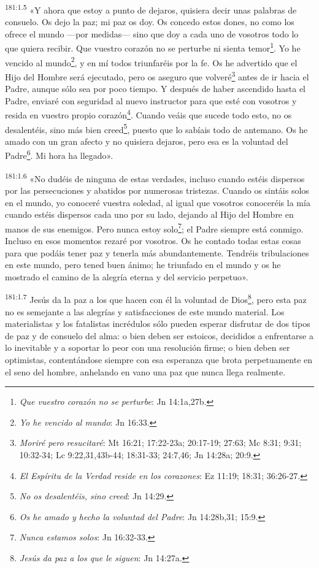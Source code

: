 \par
\textsuperscript{181:1.5} «Y ahora que estoy a punto de dejaros, quisiera decir unas palabras de consuelo. Os dejo la paz; mi paz os doy. Os concedo estos dones, no como los ofrece el mundo ---por medidas--- sino que doy a cada uno de vosotros todo lo que quiera recibir. Que vuestro corazón no se perturbe ni sienta temor\footnote{\textit{Que vuestro corazón no se perturbe}: Jn 14:1a,27b.}. Yo he vencido al mundo\footnote{\textit{Yo he vencido al mundo}: Jn 16:33.}, y en mí todos triunfaréis por la fe. Os he advertido que el Hijo del Hombre será ejecutado, pero os aseguro que volveré\footnote{\textit{Moriré pero resucitaré}: Mt 16:21; 17:22-23a; 20:17-19; 27:63; Mc 8:31; 9:31; 10:32-34; Lc 9:22,31,43b-44; 18:31-33; 24:7,46; Jn 14:28a; 20:9.} antes de ir hacia el Padre, aunque sólo sea por poco tiempo. Y después de haber ascendido hasta el Padre, enviaré con seguridad al nuevo instructor para que esté con vosotros y resida en vuestro propio corazón\footnote{\textit{El Espíritu de la Verdad reside en los corazones}: Ez 11:19; 18:31; 36:26-27.}. Cuando veáis que sucede todo esto, no os desalentéis, sino más bien creed\footnote{\textit{No os desalentéis, sino creed}: Jn 14:29.}, puesto que lo sabíais todo de antemano. Os he amado con un gran afecto y no quisiera dejaros, pero esa es la voluntad del Padre\footnote{\textit{Os he amado y hecho la voluntad del Padre}: Jn 14:28b,31; 15:9.}. Mi hora ha llegado».

\par
\textsuperscript{181:1.6} «No dudéis de ninguna de estas verdades, incluso cuando estéis dispersos por las persecuciones y abatidos por numerosas tristezas. Cuando os sintáis solos en el mundo, yo conoceré vuestra soledad, al igual que vosotros conoceréis la mía cuando estéis dispersos cada uno por su lado, dejando al Hijo del Hombre en manos de sus enemigos. Pero nunca estoy solo\footnote{\textit{Nunca estamos solos}: Jn 16:32-33.}; el Padre siempre está conmigo. Incluso en esos momentos rezaré por vosotros. Os he contado todas estas cosas para que podáis tener paz y tenerla más abundantemente. Tendréis tribulaciones en este mundo, pero tened buen ánimo; he triunfado en el mundo y os he mostrado el camino de la alegría eterna y del servicio perpetuo».

\par
\textsuperscript{181:1.7} Jesús da la paz a los que hacen con él la voluntad de Dios\footnote{\textit{Jesús da paz a los que le siguen}: Jn 14:27a.}, pero esta paz no es semejante a las alegrías y satisfacciones de este mundo material. Los materialistas y los fatalistas incrédulos sólo pueden esperar disfrutar de dos tipos de paz y de consuelo del alma: o bien deben ser estoicos, decididos a enfrentarse a lo inevitable y a soportar lo peor con una resolución firme; o bien deben ser optimistas, contentándose siempre con esa esperanza que brota perpetuamente en el seno del hombre, anhelando en vano una paz que nunca llega realmente.


